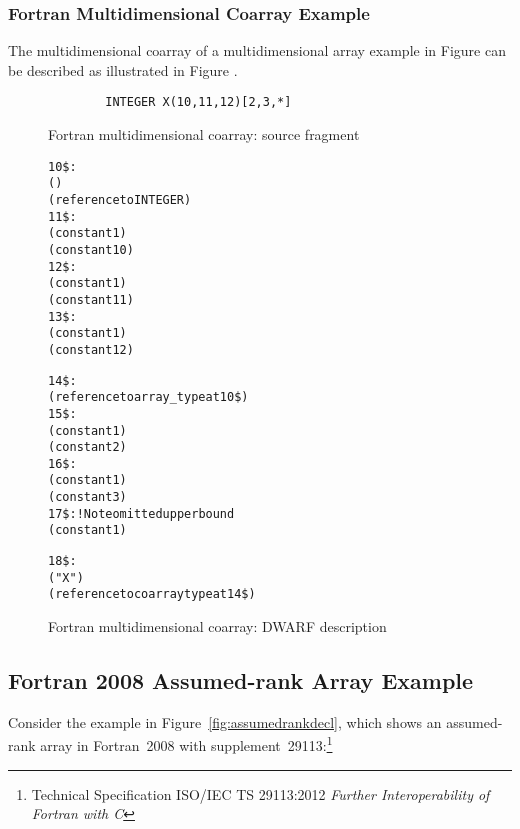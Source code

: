 \subsubsection{Fortran Multidimensional Coarray Example}
The  multidimensional coarray of a multidimensional array example
in Figure  can be described as 
illustrated in Figure .

\begin{figure}[here]
\begin{lstlisting}
        INTEGER X(10,11,12)[2,3,*]
\end{lstlisting}
\caption{Fortran multidimensional coarray: source fragment}
\label{fig:Fortranmultidimensionalcoarraysourcefragment}
\end{figure}

\begin{figure}[here]
\begin{dwflisting}
\begin{alltt}
10\$: \DWTAGarraytype
        \DWATordering(\DWORDcolmajor)
        \DWATtype(reference to INTEGER)
11\$:    \DWTAGsubrangetype
            \DWATlowerbound(constant 1)
            \DWATupperbound(constant 10)
12\$:    \DWTAGsubrangetype
            \DWATlowerbound(constant  1)
            \DWATupperbound(constant 11)
13\$:    \DWTAGsubrangetype
            \DWATlowerbound(constant  1)
            \DWATupperbound(constant 12)

14\$: \DWTAGcoarraytype
        \DWATtype(reference to array_type at 10\$)
15\$:    \DWTAGsubrangetype
            \DWATlowerbound(constant 1)
            \DWATupperbound(constant 2)
16\$:    \DWTAGsubrangetype
            \DWATlowerbound(constant 1)
            \DWATupperbound(constant 3)
17\$:    \DWTAGsubrangetype                ! Note omitted upper bound
            \DWATlowerbound(constant 1)

18\$: \DWTAGvariable
        \DWATname("X")
        \DWATtype(reference to coarray type at 14\$)
\end{alltt}
\end{dwflisting}
\caption{Fortran multidimensional coarray: DWARF description}
\label{fig:FortranmultidimensionalcoarrayDWARFdescription}
\end{figure}


\clearpage
\subsection{Fortran 2008 Assumed-rank Array Example}
\label{app:assumedrankexample}
Consider the example in Figure~\ref{fig:assumedrankdecl}, which shows
an assumed-rank array in Fortran~2008 with
supplement~29113:\footnote{Technical Specification ISO/IEC TS
  29113:2012 \emph{Further Interoperability of Fortran with C}}

